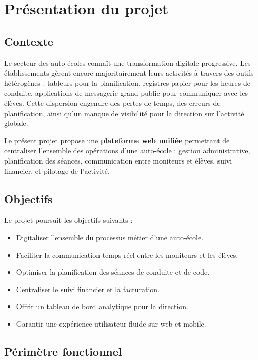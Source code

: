 \documentclass[12pt,a4paper]{article}
\newcommand{\highlight}[1]{\textbf{\color{primary}#1}}
\begin{document}
\tableofcontents
\newpage

\section{Présentation du projet}

\subsection{Contexte}

Le secteur des auto-écoles connaît une transformation digitale progressive. Les établissements gèrent encore majoritairement leurs activités à travers des outils hétérogènes : tableurs pour la planification, registres papier pour les heures de conduite, applications de messagerie grand public pour communiquer avec les élèves. Cette dispersion engendre des pertes de temps, des erreurs de planification, ainsi qu'un manque de visibilité pour la direction sur l'activité globale.

Le présent projet propose une \highlight{plateforme web unifiée} permettant de centraliser l'ensemble des opérations d'une auto-école : gestion administrative, planification des séances, communication entre moniteurs et élèves, suivi financier, et pilotage de l'activité.

\subsection{Objectifs}

Le projet poursuit les objectifs suivants :

\begin{itemize}[leftmargin=*,itemsep=4pt]
    \item Digitaliser l'ensemble du processus métier d'une auto-école.
    \item Faciliter la communication temps réel entre les moniteurs et les élèves.
    \item Optimiser la planification des séances de conduite et de code.
    \item Centraliser le suivi financier et la facturation.
    \item Offrir un tableau de bord analytique pour la direction.
    \item Garantir une expérience utilisateur fluide sur web et mobile.
\end{itemize}

\subsection{Périmètre fonctionnel}
\end{document}

